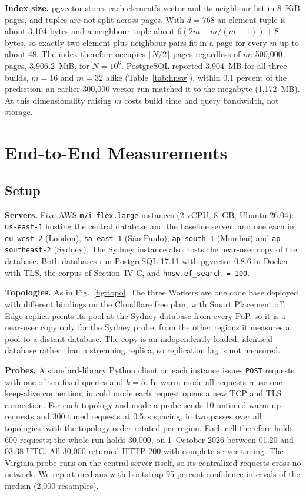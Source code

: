 \documentclass[conference]{IEEEtran}
\newcommand{\code}[1]{\texttt{#1}}
\begin{document}
\textbf{Index size.} pgvector stores each element's vector and its neighbour list in 8~KiB pages,
and tuples are not split across pages. With $d = 768$ an element tuple is about 3{,}104 bytes and a
neighbour tuple about $6(2m + m/(m-1)) + 8$ bytes, so exactly two element-plus-neighbour pairs fit
in a page for every $m$ up to about 48. The index therefore occupies $\lceil N/2 \rceil$ pages
regardless of $m$: 500{,}000 pages, 3{,}906.2~MiB, for $N = 10^6$. PostgreSQL reported 3{,}904~MB
for all three builds, $m = 16$ and $m = 32$ alike (Table~\ref{tab:hnsw}), within 0.1 percent of
the prediction; an earlier 300{,}000-vector run matched it to the megabyte (1{,}172~MB). At this
dimensionality raising $m$ costs build time and query bandwidth, not storage.

\section{End-to-End Measurements}\label{sec:e2e}

\subsection{Setup}
\textbf{Servers.} Five AWS \code{m7i-flex.large} instances (2 vCPU, 8~GB, Ubuntu 26.04):
\code{us-east-1} hosting the central database and the baseline server, and one each in
\code{eu-west-2} (London), \code{sa-east-1} (S\~ao Paulo), \code{ap-south-1} (Mumbai) and
\code{ap-southeast-2} (Sydney). The Sydney instance also hosts the near-user copy of the database.
Both databases run PostgreSQL 17.11 with pgvector 0.8.6 in Docker with TLS, the corpus of
Section~IV-C, and \code{hnsw.ef\_search = 100}.

\textbf{Topologies.} As in Fig.~\ref{fig:topo}. The three Workers are one code base deployed with
different bindings on the Cloudflare free plan, with Smart Placement off. Edge-replica points its
pool at the Sydney database from every PoP, so it is a near-user copy only for the Sydney probe;
from the other regions it measures a pool to a distant database. The copy is an independently
loaded, identical database rather than a streaming replica, so replication lag is not measured.

\textbf{Probes.} A standard-library Python client on each instance issues \code{POST} requests
with one of ten fixed queries and $k = 5$. In warm mode all requests reuse one keep-alive
connection; in cold mode each request opens a new TCP and TLS connection. For each topology and
mode a probe sends 10 untimed warm-up requests and 300 timed requests at 0.5~s spacing, in two
passes over all topologies, with the topology order rotated per region. Each cell therefore holds
600 requests; the whole run holds 30{,}000, on 1~October 2026 between 01:20 and 03:38 UTC. All
30{,}000 returned HTTP 200 with complete server timing. The Virginia probe runs on the central
server itself, so its centralized requests cross no network. We report medians with bootstrap 95
percent confidence intervals of the median (2{,}000 resamples).
\end{document}
